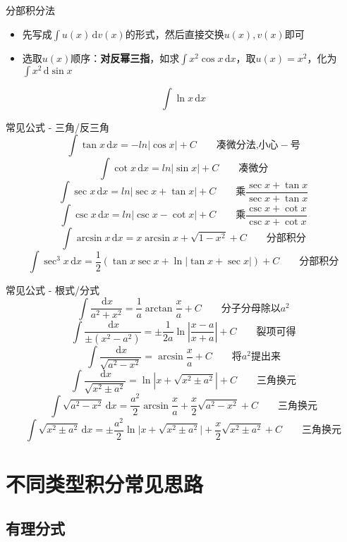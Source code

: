 \documentclass[UTF8]{ctexbeamer}
\def\diff{\,\mathrm{d}}
\begin{document}
\begin{frame}{分部积分法}
\begin{itemize}
	\item 先写成$\displaystyle\int u(x)\diff v(x)$的形式，然后直接交换$u(x),v(x)$即可
	\item 选取$u(x)$顺序：\textbf{对反幂三指}，如求$\displaystyle\int x^2\cos x\diff x$，取$u(x)=x^2$，化为$\displaystyle\int x^2\diff\sin x$
\end{itemize}
\begin{example}
\[\int\ln x\diff x\]
\end{example}
\end{frame}

\begin{frame}{常见公式 - 三角/反三角}
\[\int \tan x\diff x=-ln|\cos x|+C\qquad\mbox{凑微分法,小心}-\mbox{号}\]
\[\int \cot x\diff x=ln|\sin x|+C\qquad\mbox{凑微分}\]
\[\int \sec x\diff x=ln|\sec x+\tan x|+C\qquad\mbox{乘}\frac{\sec x+\tan x}{\sec x+\tan x}\]
\[\int \csc x\diff x=ln|\csc x-\cot x|+C\qquad\mbox{乘}\frac{\csc x+\cot x}{\csc x+\cot x}\]
\[\int \arcsin x\diff x=x\arcsin x+\sqrt{1-x^2}+C\qquad\mbox{分部积分}\]
\[\int \sec^3 x \diff x=\frac{1}{2} (\tan x \sec x+\ln |\tan x+\sec x|)+C\qquad\mbox{分部积分}\]
\end{frame}

\begin{frame}{常见公式 - 根式/分式}
\[\int \frac{\diff x}{a^2+x^2}=\frac{1}{a} \arctan\frac{x}{a}+C\qquad\mbox{分子分母除以}a^2\]
\[\int \frac{\diff x}{\pm(x^2-a^2)}=\pm\frac{1}{2a} \ln\left|\frac{x-a}{x+a}\right|+C\qquad\mbox{裂项可得}\]
\[\int \frac{\diff x}{\sqrt{a^2-x^2}}=\arcsin\frac{x}{a}+C\qquad\mbox{将}a^2\mbox{提出来}\]
\[\int \frac{\diff x}{\sqrt{x^2\pm a^2}}=\ln|x+\sqrt{x^2\pm a^2}|+C\qquad\mbox{三角换元}\]
\[\int \sqrt{a^2-x^2}\diff x=\frac{a^2}{2}\arcsin\frac{x}{a}+\frac{x}{2}\sqrt{a^2-x^2}+C\qquad\mbox{三角换元}\]
\[\int \sqrt{x^2\pm a^2}\diff x=\pm\frac{a^2}{2} \ln\Big|x+\sqrt{x^2\pm a^2}\Big|+\frac{x}{2}\sqrt{x^2\pm a^2}+C\qquad\mbox{三角换元}\]
\end{frame}

\section{不同类型积分常见思路}
\begin{frame}
\sectionpage
\end{frame}

\subsection{有理分式}
\begin{frame}
\subsectionpage
\end{frame}
\end{document}
